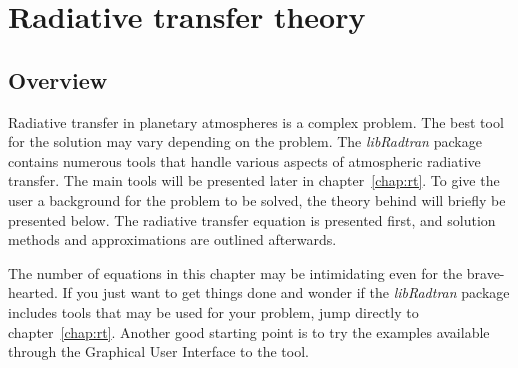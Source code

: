\chapter{Radiative transfer theory}
\label{chap:rttheory}

\section{Overview}

Radiative transfer in planetary atmospheres is a complex problem. The
best tool for the solution may vary depending on the problem.
The {\sl libRadtran} package contains numerous tools that handle
various aspects of atmospheric radiative transfer. The main tools
will be presented later in chapter~\ref{chap:rt}. To give the
user a background for the problem to be solved, the theory behind will
briefly be presented below. The radiative transfer
equation is presented first, and solution methods and approximations are 
outlined afterwards. 

The number of equations in this chapter may be intimidating
even for the brave-hearted. If you just want to get things done and
wonder if the {\sl libRadtran} package includes tools that may be used
for your problem, jump directly to chapter~\ref{chap:rt}. Another good
starting point is to try the examples available through the Graphical
User Interface to the  tool.


